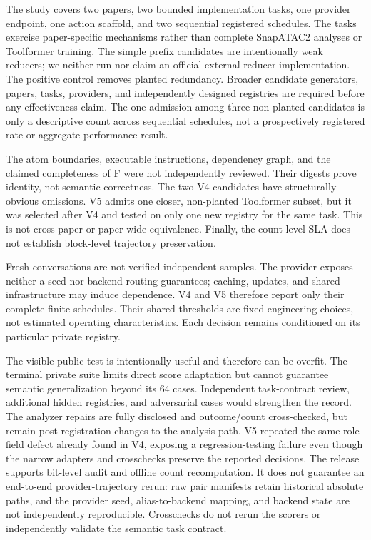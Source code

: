 \documentclass[letterpaper]{article} %
\begin{document}
The study covers two papers, two bounded implementation tasks, one provider
endpoint, one action scaffold, and two sequential registered schedules.  The tasks
exercise paper-specific mechanisms rather than complete SnapATAC2 analyses or
Toolformer training.  The simple prefix candidates are intentionally weak
reducers; we neither run nor claim an official external reducer implementation.
The positive control removes planted redundancy.  Broader candidate generators,
papers, tasks, providers, and independently designed registries are required
before any effectiveness claim.  The one admission among three non-planted
candidates is only a descriptive count across sequential schedules, not a
prospectively registered rate or aggregate performance result.

The atom boundaries, executable instructions, dependency graph, and the claimed
completeness of F were not independently reviewed.  Their digests prove identity,
not semantic correctness.  The two V4 candidates have structurally obvious
omissions.  V5 admits one closer, non-planted Toolformer subset, but it was
selected after V4 and tested on only one new registry for the same task.  This is
not cross-paper or paper-wide equivalence.  Finally, the count-level SLA does not
establish block-level trajectory preservation.

Fresh conversations are not verified independent samples.  The provider exposes
neither a seed nor backend routing guarantees; caching, updates, and shared
infrastructure may induce dependence.  V4 and V5 therefore report only their
complete finite schedules.  Their shared thresholds are fixed engineering
choices, not estimated operating characteristics.  Each decision remains
conditioned on its particular private registry.

The visible public test is intentionally useful and therefore can be overfit.
The terminal private suite limits direct score adaptation but cannot guarantee
semantic generalization beyond its 64 cases.  Independent task-contract review,
additional hidden registries, and adversarial cases would strengthen the record.
The analyzer repairs are fully disclosed and outcome/count cross-checked, but
remain post-registration changes to the analysis path.  V5 repeated the same
role-field defect already found in V4, exposing a regression-testing failure even
though the narrow adapters and crosschecks preserve the reported decisions.
The release supports bit-level audit and offline count recomputation.  It does not
guarantee an end-to-end provider-trajectory rerun: raw pair manifests retain
historical absolute paths, and the provider seed, alias-to-backend mapping, and
backend state are not independently reproducible.  Crosschecks do not rerun the
scorers or independently validate the semantic task contract.
\end{document}
